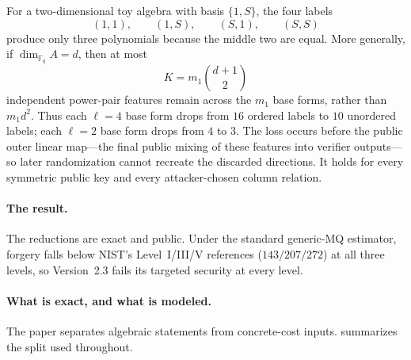 \documentclass[11pt]{article}
\newcommand{\F}{\mathbb F}
\begin{document}
For a two-dimensional toy algebra with basis $\{1,S\}$, the four labels
\[
 (1,1),\qquad(1,S),\qquad(S,1),\qquad(S,S)
\]
produce only three polynomials because the middle two are equal.  More
generally, if $\dim_{\F_q}A=d$, then at most
\begin{equation}\label{eq:intro-K}
  K=m_1\binom{d+1}{2}
\end{equation}
independent power-pair features remain across the $m_1$ base forms, rather
than $m_1d^2$.  Thus each $\ell=4$ base form drops from $16$ ordered labels to
$10$ unordered labels; each $\ell=2$ base form drops from $4$ to $3$.  The
loss occurs before the public outer linear map---the final public mixing of
these features into verifier outputs---so later randomization cannot recreate
the discarded directions.  It holds for every symmetric public key
and every attacker-chosen column relation.

\begin{center}
\end{center}

\paragraph{The result.}
The reductions are exact and public.  Under the standard generic-MQ estimator,
forgery falls below NIST's Level~I/III/V references ($143/207/272$) at all
three levels, so Version~2.3 fails its targeted security at every level.

\paragraph{What is exact, and what is modeled.}
The paper separates algebraic statements from concrete-cost inputs.
 summarizes the split used throughout.
\end{document}
